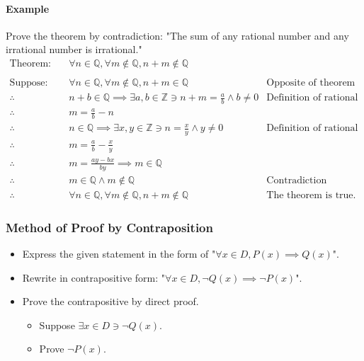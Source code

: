 \paragraph*{Example}
Prove the theorem by contradiction: "The sum of any rational number and any irrational number is irrational."
\begin{align*}
    \text{Theorem:} \quad & \forall n \in \mathbb{Q}, \forall m \notin \mathbb{Q}, n + m \notin \mathbb{Q}\\
    \\
    \text{Suppose:} \quad & \forall n \in \mathbb{Q}, \forall m \notin \mathbb{Q}, n+m \in \mathbb{Q} & \text{Opposite of theorem}\\
    \therefore \quad & n + b \in \mathbb{Q} \implies \exists a,b \in \mathbb{Z} \ni n + m = \frac{a}{b} \land b \neq 0 & \text{Definition of rational numbers}\\
    \therefore \quad & m = \frac{a}{b} - n\\
    \therefore \quad & n \in \mathbb{Q} \implies \exists x,y \in \mathbb{Z} \ni n = \frac{x}{y} \land y \neq 0 & \text{Definition of rational numbers}\\
    \therefore \quad & m = \frac{a}{b} - \frac{x}{y}\\
    \therefore \quad & m = \frac{ay - bx}{by} \implies m \in \mathbb{Q}\\
    \therefore \quad & m \in \mathbb{Q} \land m \notin \mathbb{Q} & \text{Contradiction}\\
    \therefore \quad & \forall n \in \mathbb{Q}, \forall m \notin \mathbb{Q}, n + m \notin \mathbb{Q} & \text{The theorem is true.}
\end{align*}


\subsubsection*{Method of Proof by Contraposition}
\begin{itemize}
    \item Express the given statement in the form of "$\forall x \in D, P(x) \implies Q(x)$".
    \item Rewrite in contrapositive form: "$\forall x \in D, \neg Q(x) \implies \neg P(x)$".
    \item Prove the contrapositive by direct proof.
    \begin{itemize}
        \item Suppose $\exists x \in D \ni \neg Q(x)$.
        \item Prove $\neg P(x)$.
    \end{itemize}
\end{itemize}

